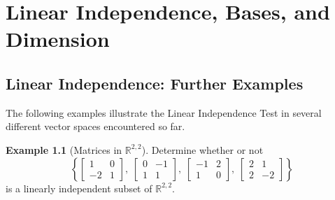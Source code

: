 \documentclass[11pt, a4paper, notitlepage]{report}
\theoremstyle{definition}
\newtheorem{example}[theorem]{Example}
\theoremstyle{remark}
\begin{document}
\chapter{Linear Independence, Bases, and Dimension}
\label{chap:week3}

\section{Linear Independence: Further Examples}

The following examples illustrate the Linear Independence Test in several different vector spaces encountered so far.

\begin{example}[Matrices in $\mathbb{R}^{2,2}$]\label{ex:matrices-li}
Determine whether or not
\[
  \left\{
    \begin{bmatrix}1&0\\-2&1\end{bmatrix},\;
    \begin{bmatrix}0&-1\\1&1\end{bmatrix},\;
    \begin{bmatrix}-1&2\\1&0\end{bmatrix},\;
    \begin{bmatrix}2&1\\2&-2\end{bmatrix}
  \right\}
\]
is a linearly independent subset of $\mathbb{R}^{2,2}$.


\end{example}
\end{document}
